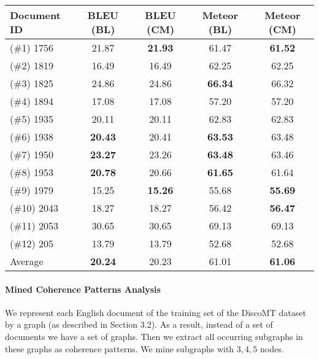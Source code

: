 \begin{table*}[!h]
\centering
\begin{tabular}{l|cc|cc}
\hline
\textbf{Document ID} & \textbf{BLEU (BL)} & \textbf{BLEU (CM)} & \textbf{Meteor (BL)} & \textbf{Meteor (CM)}\\
\hline
(\#1) 1756 & 21.87  & \textbf{21.93}  & 61.47 & \textbf{61.52}\\
(\#2) 1819 & 16.49  & 16.49  & 62.25 & 62.25\\
(\#3) 1825 & 24.86  & 24.86  & \textbf{66.34} & 66.32\\
(\#4) 1894 & 17.08  & 17.08  & 57.20 & 57.20\\
(\#5) 1935 & 20.11  & 20.11  & 62.83 & 62.83\\
(\#6) 1938 & \textbf{20.43}  & 20.41  & \textbf{63.53} & 63.48\\
(\#7) 1950 & \textbf{23.27}  & 23.26  & \textbf{63.48} & 63.46\\
(\#8) 1953 & \textbf{20.78}  & 20.66  & \textbf{61.65} & 61.64\\
(\#9) 1979 & 15.25  & \textbf{15.26}  & 55.68 & \textbf{55.69}\\
(\#10) 2043 & 18.27  & 18.27  & 56.42 &  \textbf{56.47}\\
(\#11) 2053 & 30.65  & 30.65  & 69.13 & 69.13\\
(\#12) 205 & 13.79  & 13.79  & 52.68 & 52.68\\
\hline
Average & \textbf{20.24}  & 20.23  & 61.01 & \textbf{61.06}\\
\hline
\end{tabular}
\label{tab:cmresultsDMT2015}
\end{table*}

\paragraph{Mined Coherence Patterns Analysis}
%
We represent each English document of the training set of the DiscoMT dataset by a graph (as described in Section 
3.2). 
As a result, instead of a set of documents we have a set of graphs.
Then we extract all occurring subgraphs in these graphs as coherence patterns. 
We mine subgraphs with ${3,4,5}$ nodes. 

